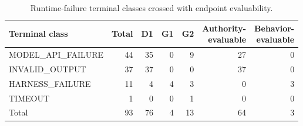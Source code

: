 \begin{table}[t]
\centering
\footnotesize
\caption{Runtime-failure terminal classes crossed with endpoint evaluability.}
\label{tab:runtime-endpoint}
\begin{tabular}{@{}lrrrrrr@{}}
\toprule
Terminal class & Total & D1 & G1 & G2 & \shortstack{Authority-\\evaluable} & \shortstack{Behavior-\\evaluable} \\
\midrule
MODEL\_API\_FAILURE & 44 & 35 & 0 & 9 & 27 & 0 \\
INVALID\_OUTPUT & 37 & 37 & 0 & 0 & 37 & 0 \\
HARNESS\_FAILURE & 11 & 4 & 4 & 3 & 0 & 3 \\
TIMEOUT & 1 & 0 & 0 & 1 & 0 & 0 \\
\midrule
Total & 93 & 76 & 4 & 13 & 64 & 3 \\
\bottomrule
\end{tabular}
\end{table}
